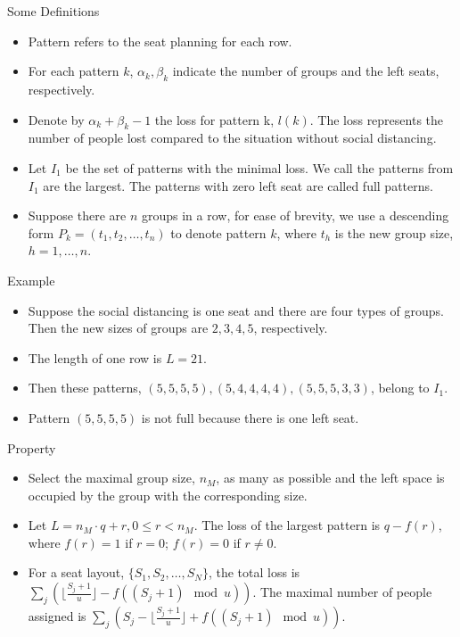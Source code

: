   \begin{frame}{Some Definitions}
    \begin{itemize}
      \item Pattern refers to the seat planning for each row.
      \item For each pattern $k$, $\alpha_k, \beta_k$ indicate the number of groups and the left seats, respectively.
      \item Denote by $\alpha_k + \beta_k- 1$ the loss for pattern k, $l(k)$. The loss represents the number of people lost compared to the situation without social distancing.
      \item Let $I_1$ be the set of patterns with the minimal loss. We call the patterns from $I_1$ are the largest. The patterns with zero left seat are called full patterns.
      \item Suppose there are $n$ groups in a row, for ease of brevity, we use a descending form $P_{k} = (t_1, t_2, \ldots, t_n)$ to denote pattern $k$, where $t_h$ is the new group size, $h = 1,\ldots, n$.
    \end{itemize}
  \end{frame}

  \begin{frame}{Example}
    \begin{itemize}
      \item Suppose the social distancing is one seat and there are four types of groups. Then the new sizes of groups are $2, 3, 4, 5$, respectively. 
      \item The length of one row is $L = 21$.
      \item Then these patterns, $(5, 5, 5, 5), (5, 4, 4, 4, 4),(5, 5, 5, 3, 3)$, belong to $I_1$.
      \item Pattern $(5, 5, 5, 5)$ is not full because there is one left seat.
    \end{itemize}
  \end{frame}

  \begin{frame}{Property}
    \begin{itemize}
      \item Select the maximal group size, $n_{M}$, as many as possible and the left space is occupied by the group with the corresponding size.
      \item Let $L = n_{M} \cdot q + r, 0 \leq r < n_{M}$. The loss of the largest pattern is $q - f(r)$, where $f(r) =1$ if $r=0$; $f(r) =0$ if $r \neq 0$.
      \item For a seat layout, $\{S_1, S_2, \ldots, S_{N}\}$, the total loss is $\sum_{j} (\lfloor \frac{S_j+1}{u} \rfloor - f((S_j +1)\mod u))$. The maximal number of people assigned is $\sum_{j} (S_j - \lfloor \frac{S_j+1}{u} \rfloor + f((S_j +1)\mod u))$.
      
    \end{itemize}
  \end{frame}
  
